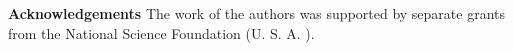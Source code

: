 \bigskip\noindent
{\bf Acknowledgements}  The work of the authors was supported
by separate grants from the National Science Foundation (U. S. A. ).

